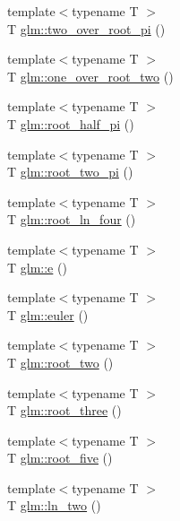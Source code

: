 \begin{DoxyCompactItemize}
\item 
{\footnotesize template$<$typename T $>$ }\\\-T \hyperlink{group__gtx__constants_ga9fd47e013242a878c1a116df44c9411b}{glm\-::two\-\_\-over\-\_\-root\-\_\-pi} ()
\item 
{\footnotesize template$<$typename T $>$ }\\\-T \hyperlink{group__gtx__constants_ga78ff8358b2c08b7bfb156e2688043c48}{glm\-::one\-\_\-over\-\_\-root\-\_\-two} ()
\item 
{\footnotesize template$<$typename T $>$ }\\\-T \hyperlink{group__gtx__constants_ga274427c1168326de2375b984bd636479}{glm\-::root\-\_\-half\-\_\-pi} ()
\item 
{\footnotesize template$<$typename T $>$ }\\\-T \hyperlink{group__gtx__constants_ga63eb900e4144d057fa250932c0d876af}{glm\-::root\-\_\-two\-\_\-pi} ()
\item 
{\footnotesize template$<$typename T $>$ }\\\-T \hyperlink{group__gtx__constants_gaf5d00f6fd6c5d43d8fe2f5f28f3f681c}{glm\-::root\-\_\-ln\-\_\-four} ()
\item 
{\footnotesize template$<$typename T $>$ }\\\-T \hyperlink{group__gtx__constants_gaa189b598f95c996961eab8765aa9feb5}{glm\-::e} ()
\item 
{\footnotesize template$<$typename T $>$ }\\\-T \hyperlink{group__gtx__constants_gaf57977dcb1a4783b5dc09bc8fb71162f}{glm\-::euler} ()
\item 
{\footnotesize template$<$typename T $>$ }\\\-T \hyperlink{group__gtx__constants_ga4a430ec7bd363dbd34948d4b51da11e2}{glm\-::root\-\_\-two} ()
\item 
{\footnotesize template$<$typename T $>$ }\\\-T \hyperlink{group__gtx__constants_gaf7fe63c1ad491999f13c05b64794e09c}{glm\-::root\-\_\-three} ()
\item 
{\footnotesize template$<$typename T $>$ }\\\-T \hyperlink{group__gtx__constants_ga67f9ec62c2b49ed71766f05ece8ccb84}{glm\-::root\-\_\-five} ()
\item 
{\footnotesize template$<$typename T $>$ }\\\-T \hyperlink{group__gtx__constants_ga945cd734aac0ea15e2b3e18ff4a1d729}{glm\-::ln\-\_\-two} ()
\item 

\end{DoxyCompactItemize}
